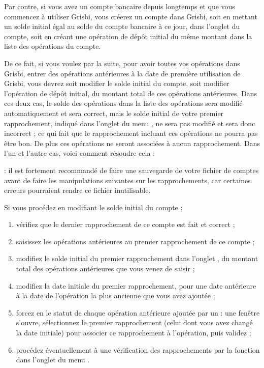 Par contre, si vous avez un compte bancaire depuis longtemps et que vous commencez à  utiliser Grisbi, vous créerez un compte dans Grisbi, soit en mettant un solde initial égal au solde du compte bancaire à ce jour, dans l'onglet  du compte, soit en créant une opération de dépôt initial du même montant dans la liste des opérations du compte. 

De ce fait, si vous voulez par la suite, pour avoir toutes vos opérations dans Grisbi, entrer des opérations antérieures à la date de première utilisation de Grisbi, vous devrez soit modifier le solde initial du compte, soit modifier l'opération de dépôt initial, du montant total de ces opérations antérieures. Dans ces deux cas, le solde des opérations dans la liste des opérations sera modifié automatiquement et sera correct, mais le solde initial de votre premier rapprochement, indiqué dans l'onglet  du menu , ne sera pas modifié et sera donc incorrect ; ce qui fait que le rapprochement incluant ces opérations ne pourra pas être bon. De plus ces opérations ne seront associées à aucun rapprochement. Dans l'un et l'autre cas, voici comment résoudre cela :

 : il est fortement recommandé de faire une sauvegarde de votre fichier de comptes avant de faire les manipulations suivantes sur les rapprochements, car certaines erreurs pourraient rendre ce fichier inutilisable.


Si vous procédez en modifiant le solde initial du compte : 

\begin{enumerate}
	\item vérifiez que le dernier rapprochement de ce compte est fait et correct ;
	\item saisissez les opérations antérieures au premier rapprochement de ce compte ;	
	\item modifiez le solde initial du premier rapprochement dans l'onglet , du montant total des opérations antérieures que vous venez de saisir ;
	\item modifiez la date initiale du premier rapprochement, pour une date antérieure à la date de l'opération la plus ancienne que vous avez ajoutée ;
	\item forcez en  le statut de chaque opération antérieure ajoutée par un  : une fenêtre s'ouvre, sélectionnez le premier rapprochement (celui dont vous avez changé la date initiale) pour associer ce rapprochement à l'opération, puis validez ; 
	\item  procédez éventuellement à une vérification des rapprochements par la fonction  dans l'onglet  du menu .
\end{enumerate}

